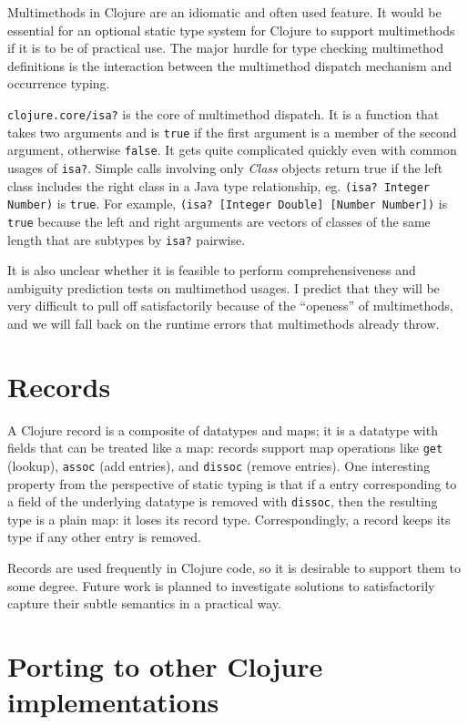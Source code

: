 Multimethods in Clojure are an idiomatic and often used feature.
It would be essential for an optional static type system for Clojure to support
multimethods if it is to be of practical use.
The major hurdle for type checking multimethod definitions is the
interaction between the multimethod dispatch mechanism and occurrence typing.

\lstinline|clojure.core/isa?| is the core of multimethod dispatch.
It is a function that takes two arguments and is \lstinline|true| if
the first argument is a member of the second argument, otherwise \lstinline|false|.
It gets quite complicated quickly even with common usages of \lstinline|isa?|.
Simple calls involving only \emph{Class} objects return true if the left class
includes the right class in a Java type relationship, eg. \lstinline|(isa? Integer Number)| is \lstinline|true|.
For example, \lstinline|(isa? [Integer Double] [Number Number])| is \lstinline|true|
because the left and right arguments are vectors of classes of the same length
that are subtypes by \lstinline|isa?| pairwise.

It is also unclear whether it is feasible to perform comprehensiveness and
ambiguity prediction tests on multimethod usages. I predict that they will be
very difficult to pull off satisfactorily because of the ``openess'' of multimethods,
and we will fall back on the runtime errors that multimethods already throw.

\section{Records}

A Clojure record is a composite of datatypes and maps; it is a datatype
with fields that can be treated like a map: records support map operations like \lstinline|get| (lookup),
\lstinline|assoc| (add entries), and \lstinline|dissoc| (remove entries).
One interesting property from the perspective of static typing is that if
a entry corresponding to a field of the underlying datatype is removed
with \lstinline|dissoc|, then the resulting type is a plain map: it loses
its record type.
Correspondingly, a record keeps its type if any other entry is removed.

Records are used frequently in Clojure code, so it is desirable
to support them to some degree. Future work is planned to investigate solutions
to satisfactorily capture their subtle semantics in a practical way.

\section{Porting to other Clojure implementations}

